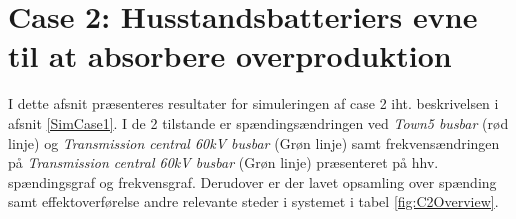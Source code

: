 

\label{ResultatOgDiskussion2}

\section{Case 2: Husstandsbatteriers evne til at absorbere overproduktion}
I dette afsnit præsenteres resultater for simuleringen af case 2 iht. beskrivelsen i afsnit \ref{SimCase1}. I de 2 tilstande er spændingsændringen ved \textit{Town5 busbar} (rød linje) og \textit{Transmission central 60kV busbar} (Grøn linje) samt frekvensændringen på \textit{Transmission central 60kV busbar} (Grøn linje) præsenteret på hhv. spændingsgraf og frekvensgraf. Derudover er der lavet opsamling over spænding samt effektoverførelse andre relevante steder i systemet i tabel \ref{fig:C2Overview}. \\ \\

